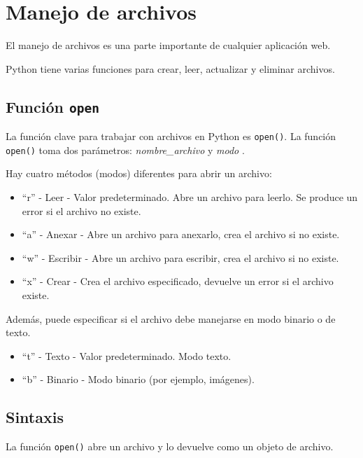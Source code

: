\chapter{Manejo de archivos}

El manejo de archivos es una parte importante de cualquier aplicación
web.

Python tiene varias funciones para crear, leer, actualizar y eliminar
archivos.

\section{\texorpdfstring{Función
\texttt{open}}{Función open}}\label{funciuxf3n-open}

La función clave para trabajar con archivos en Python es
\texttt{open()}. La función \texttt{open()} toma dos parámetros:
\emph{nombre\_archivo} y \emph{modo} .

Hay cuatro métodos (modos) diferentes para abrir un archivo:

\begin{itemize}
  \item ``r'' - Leer - Valor predeterminado. Abre un archivo para leerlo. Se
    produce un error si el archivo no existe.
  \item ``a'' - Anexar - Abre un archivo para anexarlo, crea el archivo si no existe.
  \item ``w'' - Escribir - Abre un archivo para escribir, crea el archivo si no existe.
  \item ``x'' - Crear - Crea el archivo especificado, devuelve un error si el archivo existe.
\end{itemize}

Además, puede especificar si el archivo debe manejarse en modo binario o
de texto.

\begin{itemize}
  \item ``t'' - Texto - Valor predeterminado. Modo texto.
  \item ``b'' - Binario - Modo binario (por ejemplo, imágenes).
\end{itemize}

\section{Sintaxis}

La función \texttt{open()} abre un archivo y lo devuelve como un objeto
de archivo.

\begin{Shaded}
\begin{Highlighting}[]
\NormalTok{(}
\end{Highlighting}
\end{Shaded}


